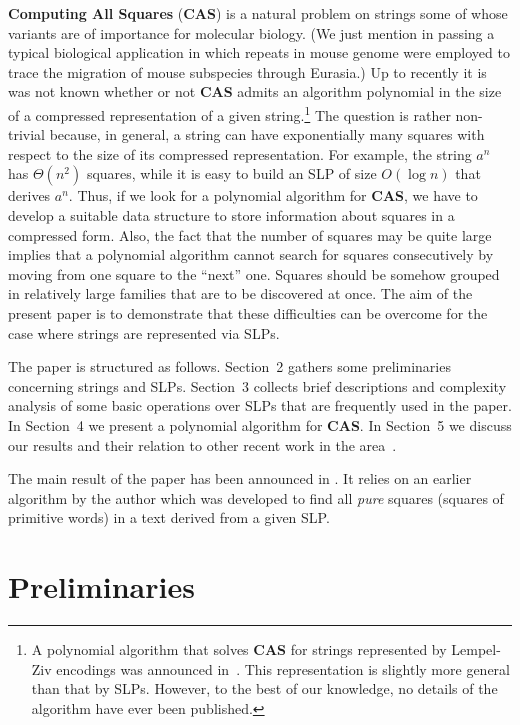\documentclass[11pt]{article}
\theoremstyle{break}
\begin{document}
\textbf{Computing All Squares} (\textbf{CAS}) is a natural problem on strings some of whose variants are of importance for molecular
biology. (We just mention in passing a typical biological application \cite{19} in which repeats in mouse genome were employed to trace the
migration of mouse subspecies through Eurasia.) Up to recently it is was not known whether or not \textbf{CAS} admits an algorithm
polynomial in the size of a compressed representation of a given string.\footnote{A polynomial algorithm that solves \textbf{CAS} for
strings represented by Lempel-Ziv encodings was announced in~\cite{8}. This representation is slightly more general than that by SLPs.
However, to the best of our knowledge, no details of the algorithm have ever been published.} The question is rather non-trivial because,
in general, a string can have exponentially many squares with respect to the size of its compressed representation. For example, the string
$a^n$ has $\Theta(n^2)$ squares, while it is easy to build an SLP of size $O(\log n)$ that derives $a^n$. Thus, if we look for a polynomial
algorithm for \textbf{CAS}, we have to develop a suitable data structure to store information about squares in a compressed form. Also, the
fact that the number of squares may be quite large implies that a polynomial algorithm cannot search for squares consecutively by moving
from one square to the ``next'' one. Squares should be somehow grouped in relatively large families that are to be discovered at once. The
aim of the present paper is to demonstrate that these difficulties can be overcome for the case where strings are represented via SLPs.

The paper is structured as follows. Section~2 gathers some preliminaries concerning strings and SLPs. Section~3 collects brief descriptions
and complexity analysis of some basic operations over SLPs that are frequently used in the paper. In Section~4 we present a polynomial
algorithm for \textbf{CAS}. In Section~5 we discuss our results and their relation to other recent work in the area~\cite{balancedsf,sf}.

The main result of the paper has been announced in \cite{RuFiDim}. It relies on an earlier algorithm by the author \cite{pure} which was
developed to find all \emph{pure} squares (squares of primitive words) in a text derived from a given SLP.


\section{Preliminaries}
\end{document}
